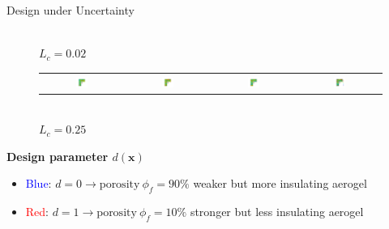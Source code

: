 \documentclass[10pt,xcolor=dvipsnames,compress]{beamer}
\begin{document}
\begin{frame}{Design under Uncertainty}
\begin{figure}[!htb]
\\$L_c=0.02$\\
\begin{tabular}{c c c c}
\includegraphics[trim={3.5in 2in 3.5in 2in},clip,width=0.16\textwidth]{Figures/high_1.png} &
\includegraphics[trim={3.5in 2in 3.5in 2in},clip,width=0.16\textwidth]{Figures/high_2.png} &
\includegraphics[trim={3.5in 2in 3.5in 2in},clip,width=0.16\textwidth]{Figures/high_3.png} &
\includegraphics[trim={3.5in 2in 3.5in 2in},clip,width=0.16\textwidth]{Figures/high_4.png} 
\end{tabular}
\\$L_c=0.25$\vspace{-0.05in}\\
\end{figure}
\textbf{Design parameter $d(\mathbf{x})$}
\begin{itemize}
    \item \textcolor{blue}{Blue}: $d=0 \xrightarrow{} \text{porosity} \: \phi_f = 90 \%$ weaker but more insulating aerogel
    \item \textcolor{red}{Red}: \:$d=1 \xrightarrow{} \text{porosity} \: \phi_f = 10 \%$ stronger but less insulating aerogel
\end{itemize}
\end{frame}
\end{document}
